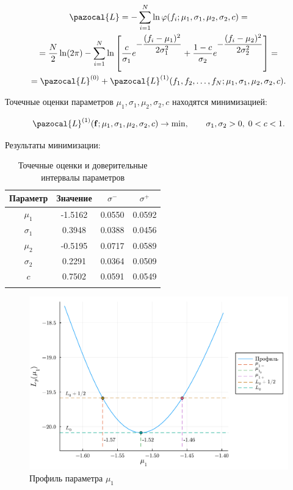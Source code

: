 \documentclass[a4paper, oneside]{article}
\newcommand{\su}{\vspace{-0.5em}}
\begin{document}
\su\su
\begin{gather*}
\pazocal{L} = - \sum_{i=1}^{N} \ln \varphi(f_i; \mu_1, \sigma_1, \mu_2, \sigma_2, c) = \\
= \frac{N}{2} \ln (2 \pi) - \sum_{i=1}^{N} \ln \left[ \frac{c}{\sigma_1} e^{\displaystyle -\frac{(f_i - \mu_1)^2}{2 \sigma_1^2}} + \frac{1 - c}{\sigma_2} e^{\displaystyle -\frac{(f_i - \mu_2)^2}{2 \sigma_2^2}} \right] = \\
= \pazocal{L}^{(0)} + \pazocal{L}^{(1)}(f_1, f_2, \ldots, f_N; \mu_1, \sigma_1, \mu_2, \sigma_2, c).
\end{gather*}

Точечные оценки параметров $ \mu_1, \sigma_1, \mu_2, \sigma_2, c $ находятся минимизацией:

$$
\pazocal{L}^{(1)}(\mathbf{f}; \mu_1, \sigma_1, \mu_2, \sigma_2, c) \rightarrow \min, \hspace{2em} \sigma_1, \sigma_2 > 0, \; 0 < c < 1.
$$

\newpage

Результаты минимизации:

\begin{table}[h]
  \centering
  \caption{Точечные оценки и доверительные интервалы параметров}
  \begin{tabular}{cccc}
    \toprule
    Параметр &
    Значение &
    $ \sigma^{-} $ &
    $ \sigma^{+} $ \\
    \midrule
    $ \mu_1 $ & -1.5162 & 0.0550 & 0.0592 \\
    \arrayrulecolor{black!40}
    \midrule
    $ \sigma_1 $ & 0.3948 & 0.0388 & 0.0456 \\
    \midrule
    $ \mu_2 $ & -0.5195 & 0.0717 & 0.0589 \\
    \midrule
    $ \sigma_2 $ & 0.2291 & 0.0364 & 0.0509 \\
    \midrule
    $ c $ & 0.7502 & 0.0591 & 0.0549 \\
    \arrayrulecolor{black}
    \bottomrule
  \end{tabular}
\end{table}

\begin{figure}[h!]
  \centering
  \includegraphics[scale=0.5]{μ₁}
  \caption{Профиль параметра $ \mu_1 $}
\end{figure}
\end{document}
